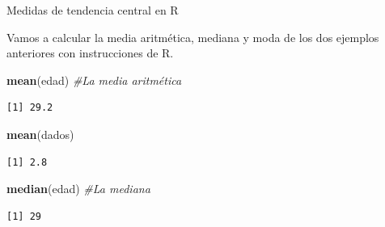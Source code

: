 \documentclass[
  ignorenonframetext,
]{beamer}
\newenvironment{Shaded}{\begin{snugshade}}{\end{snugshade}}
\newcommand{\CommentTok}[1]{\textcolor[rgb]{0.56,0.35,0.01}{\textit{#1}}}
\newcommand{\KeywordTok}[1]{\textcolor[rgb]{0.13,0.29,0.53}{\textbf{#1}}}
\newcommand{\NormalTok}[1]{#1}
\begin{document}
\begin{frame}[fragile]{Medidas de tendencia central en R}
\protect\hypertarget{medidas-de-tendencia-central-en-r}{}

Vamos a calcular la media aritmética, mediana y moda de los dos ejemplos
anteriores con instrucciones de R.

\begin{Shaded}
\begin{Highlighting}[]
\KeywordTok{mean}\NormalTok{(edad) }\CommentTok{#La media aritmética}
\end{Highlighting}
\end{Shaded}

\begin{verbatim}
[1] 29.2
\end{verbatim}

\begin{Shaded}
\begin{Highlighting}[]
\KeywordTok{mean}\NormalTok{(dados)}
\end{Highlighting}
\end{Shaded}

\begin{verbatim}
[1] 2.8
\end{verbatim}

\begin{Shaded}
\begin{Highlighting}[]
\KeywordTok{median}\NormalTok{(edad) }\CommentTok{#La mediana}
\end{Highlighting}
\end{Shaded}

\begin{verbatim}
[1] 29
\end{verbatim}

\end{frame}
\end{document}

